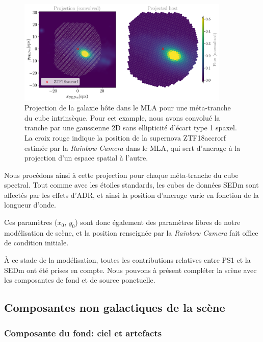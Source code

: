 \documentclass[../main/main.tex]{subfiles}
\begin{document}
\begin{figure}[ht]
  \centering
  \includegraphics[width=0.9\textwidth]{../figures/07_scene/projecthost.png}
  \caption[Projection de la galaxie hôte dans le MLA.]{Projection de la
    galaxie hôte dans le MLA pour une méta-tranche du cube
    intrinsèque. Pour cet example, nous avons convolué la tranche par une
    gaussienne 2D sans ellipticité d'écart type 1 spaxel. La croix rouge indique la position de la supernova
    ZTF18accrorf estimée par la \textit{Rainbow Camera} dans le MLA, qui
    sert d'ancrage à la projection d'un espace spatial à l'autre.}
  \label{fig:projecthost}
\end{figure}

Nous procédons ainsi à cette projection pour chaque méta-tranche du cube
spectral. Tout comme avec les étoiles standards, les 
cubes de données SEDm sont affectés par les effets d'ADR, et ainsi la position d'ancrage varie en fonction de la
longueur d'onde.

Ces paramètres ($x_{0}$, $y_{0}$) sont donc également des paramètres
libres de notre modélisation de scène, et la position renseignée par la
\textit{Rainbow Camera} fait office de condition initiale.

À ce stade de la modélisation, toutes les contributions relatives entre
PS1 et la SEDm ont été prises en compte.
Nous pouvons à présent compléter la scène avec les composantes de fond
et de source ponctuelle.

\subsection{Composantes non galactiques de la scène}

\subsubsection{Composante du fond: ciel et artefacts}
\end{document}
